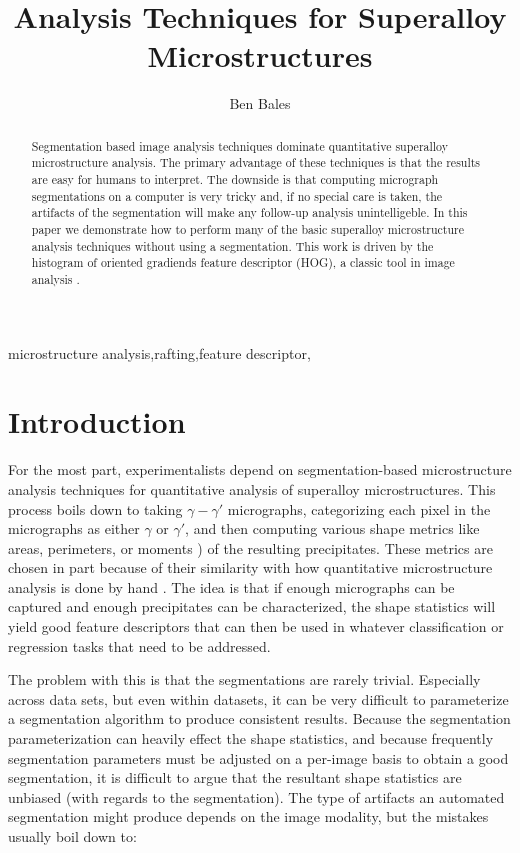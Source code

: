 \documentclass[review]{elsarticle}
\date{}
\begin{document}
	\begin{frontmatter}
		\title{Analysis Techniques for Superalloy Microstructures}

		\author{Ben Bales}
		\address{University of California, Department of Mechanical Engineering, Santa Barbara, CA 93106-5070}

		\begin{abstract}
			Segmentation based image analysis techniques dominate quantitative superalloy microstructure analysis. The primary advantage of these techniques is that the results are easy for humans to interpret. The downside is that computing micrograph segmentations on a computer is very tricky and, if no special care is taken, the artifacts of the segmentation will make any follow-up analysis unintelligeble. In this paper we demonstrate how to perform many of the basic superalloy microstructure analysis techniques without using a segmentation. This work is driven by the histogram of oriented gradiends feature descriptor (HOG), a classic tool in image analysis \cite{gradtex, hog, girsh}.
		\end{abstract}

		\begin{keyword}
			microstructure analysis\sep rafting\sep feature descriptor\sep 
		\end{keyword}
	\end{frontmatter}

	\section{Introduction}
		For the most part, experimentalists depend on segmentation-based microstructure analysis techniques for quantitative analysis of superalloy microstructures. This process boils down to taking $\gamma-\gamma'$ micrographs, categorizing each pixel in the micrographs as either $\gamma$ or $\gamma'$, and then computing various shape metrics like areas, perimeters, or moments \cite{twoDM, threeDM}) of the resulting precipitates. These metrics are chosen in part because of their similarity with how quantitative microstructure analysis is done by hand \cite{sluytman, underwood}. The idea is that if enough micrographs can be captured and enough precipitates can be characterized, the shape statistics will yield good feature descriptors that can then be used in whatever classification or regression tasks that need to be addressed.

		The problem with this is that the segmentations are rarely trivial. Especially across data sets, but even within datasets, it can be very difficult to parameterize a segmentation algorithm to produce consistent results. Because the segmentation parameterization can heavily effect the shape statistics, and because frequently segmentation parameters must be adjusted on a per-image basis to obtain a good segmentation, it is difficult to argue that the resultant shape statistics are unbiased (with regards to the segmentation). The type of artifacts an automated segmentation might produce depends on the image modality, but the mistakes usually boil down to:
\end{document}
